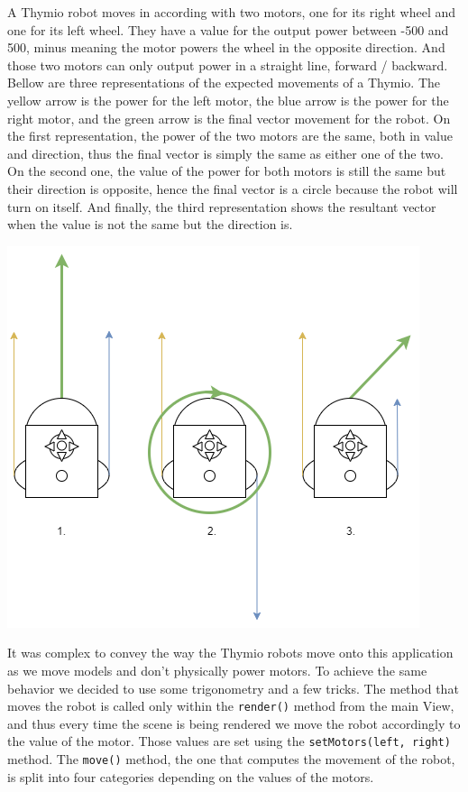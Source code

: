 \documentclass{scrbook}
\begin{document}
A Thymio robot moves in according with two motors, one for its right wheel and one for its left wheel. They have a value for the output power between -500 and 500, minus meaning the motor powers the wheel in the opposite direction. 
And those two motors can only output power in a straight line, forward / backward. Bellow are three representations of the expected movements of a Thymio. The yellow arrow is the power for the left motor, the blue arrow is the power for the right motor, 
and the green arrow is the final vector movement for the robot. On the first representation, the power of the two motors are the same, both in value and direction, thus the final vector is simply the same as either one of the two.
On the second one, the value of the power for both motors is still the same but their direction is opposite, hence the final vector is a circle because the robot will turn on itself.
And finally, the third representation shows the resultant vector when the value is not the same but the direction is.

\begin{center}
  \includegraphics[scale=0.8]{./thymio_move}
\end{center}

It was complex to convey the way the Thymio robots move onto this application as we move models and don't physically power motors. To achieve the same behavior we decided to use some trigonometry and a few tricks.
The method that moves the robot is called only within the \texttt{render()} method from the main View, and thus every time the scene is being rendered we move the robot accordingly to the value of the motor. 
Those values are set using the \texttt{setMotors(left, right)} method. The \texttt{move()} method, the one that computes the movement of the robot, is split into four categories depending on the values of the motors. 
\end{document}
